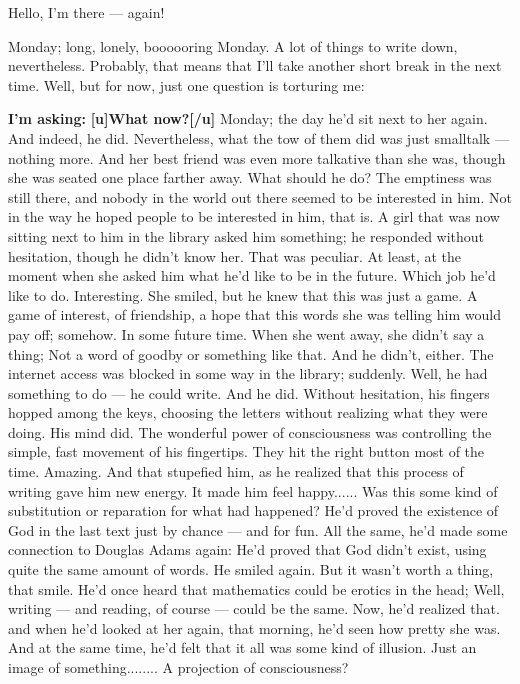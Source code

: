 Hello, I'm there --- again!

Monday; long, lonely, boooooring Monday. 
A lot of things to write down, nevertheless. 
Probably, that means that I'll take another short break in the next time. 
Well, but for now, just one question is torturing me:

\textbf{I'm asking:}
\textbf{[u]What now?[/u]}
Monday; the day he'd sit next to her again. And indeed, he did. Nevertheless, what the tow of them did was just smalltalk --- nothing more. 
And her best friend was even more talkative than she was, though she was seated one place farther away. 
What should he do? The emptiness was still there, and nobody in the world out there seemed to be interested in him. 
Not in the way he hoped people to be interested in him, that is. 
A girl that was now sitting next to him in the library asked him something; he responded without hesitation, though he didn't know her. 
That was peculiar. 
At least, at the moment when she asked him what he'd like to be in the future. 
Which job he'd like to do. 
Interesting. 
She smiled, but he knew that this was just a game. A game of interest, of friendship, a hope that this words she was telling him would pay off; somehow. 
In some future time. 
When she went away, she didn't say a thing; Not a word of goodby or something like that. 
And he didn't, either. 
The internet access was blocked in some way in the library; suddenly. Well, he had something to do --- he could write. And he did. 
Without hesitation, his fingers hopped among the keys, choosing the letters without realizing what they were doing. 
His mind did. The wonderful power of consciousness was controlling the simple, fast movement of his fingertips. 
They hit the right button most of the time. 
Amazing. 
And that stupefied him, as he realized that this process of writing gave him new energy. It made him feel happy......
Was this some kind of substitution or reparation for what had happened?
He'd proved the existence of God in the last text just by chance --- and for fun. 
All the same, he'd made some connection to Douglas Adams again: He'd proved that God didn't exist, using quite the same amount of words. 
He smiled again. 
But it wasn't worth a thing, that smile. 
He'd once heard that mathematics could be erotics in the head; Well, writing --- and reading, of course --- could be the same. 
Now, he'd realized that. and when he'd looked at her again, that morning, he'd seen how pretty she was. And at the same time, he'd felt that it all was some kind of illusion. 
Just an image of something........
A projection of consciousness?
